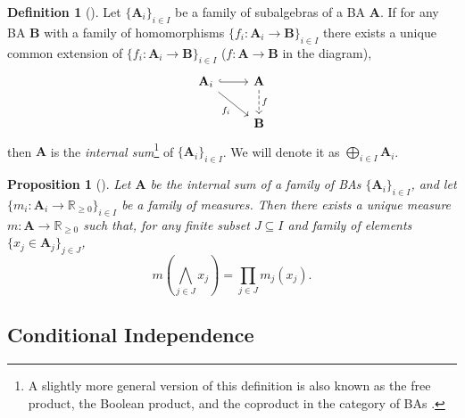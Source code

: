 \documentclass{article}
\newtheorem{proposition}{Proposition}
\theoremstyle{definition}
\newtheorem{definition}{Definition}
\theoremstyle{remark}
\begin{document}
\begin{definition}[\cite{givant2008introduction}]
  Let $\{ \mathbf{A}_i \}_{i \in I}$ be a family of subalgebras of a BA
  $\mathbf{A}$. If for any BA $\mathbf{B}$ with a family of homomorphisms $\{
  f_i\colon \mathbf{A}_i \to \mathbf{B} \}_{i \in I}$ there exists a unique
  common extension of $\{ f_i\colon \mathbf{A}_i \to \mathbf{B} \}_{i \in I}$
  ($f\colon \mathbf{A} \to \mathbf{B}$ in the diagram),
  \[
    \begin{tikzcd}
      \mathbf{A}_i \ar[r,hookrightarrow] \arrow{rd}[swap]{f_i} & \mathbf{A}
      \arrow[d,dashed,"f"] \\
      & \mathbf{B}
    \end{tikzcd}
  \]
  then $\mathbf{A}$ is the \emph{internal sum}\footnote{A slightly more general
    version of this definition is also known as the free product, the Boolean
    product, and the coproduct in the category of BAs
    \cite{givant2008introduction,koppelberg1989handbook,sikorski1969boolean}.}
  of $\{\mathbf{A}_i \}_{i \in I}$. We will denote it as $\bigoplus_{i \in I}
  \mathbf{A}_i$.
\end{definition}

\begin{proposition}[\cite{sikorski1969boolean}]
  Let $\mathbf{A}$ be the internal sum of a family of BAs $\{ \mathbf{A}_i \}_{i
    \in I}$, and let $\{m_i\colon \mathbf{A}_i \to \mathbb{R}_{\ge 0} \}_{i \in
    I}$ be a family of measures. Then there exists a unique measure $m\colon
  \mathbf{A} \to \mathbb{R}_{\ge 0}$ such that, for any finite subset $J
  \subseteq I$ and family of elements $\{ x_j \in \mathbf{A}_j \}_{j \in J}$,
  \[
    m \left( \bigwedge_{j \in J} x_j \right) = \prod_{j \in J} m_j(x_j).
  \]
\end{proposition}

\subsection{Conditional Independence}
\end{document}

